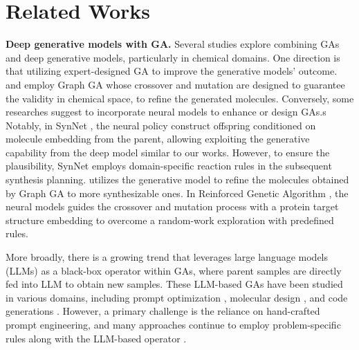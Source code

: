 \section{Related Works}
\label{sec:related}


\textbf{Deep generative models with GA.} Several studies explore combining GAs and deep generative models, particularly in chemical domains. One direction is that utilizing expert-designed GA to improve the generative models' outcome. \citet{ahn2020guiding} and \citet{kim2024genetic} employ Graph GA \citep{jensen2019graph} whose crossover and mutation are designed to guarantee the validity in chemical space, to refine the generated molecules. 
Conversely, some researches suggest to incorporate neural models to enhance or design GAs.s
Notably, in SynNet \citep{gao2022synnet}, the neural policy construct offspring conditioned on molecule embedding from the parent, allowing exploiting the generative capability from the deep model similar to our works. However, to ensure the plausibility, SynNet employs domain-specific reaction rules in the subsequent synthesis planning. 
\citet{gao2024synformer} utilizes the generative model to refine the molecules obtained by Graph GA to more synthesizable ones. In Reinforced Genetic Algorithm \citep[RGA; ][]{fu2022reinforced_ga}, the neural models guides the crossover and mutation process with a protein target structure embedding to overcome a random-work exploration with predefined rules.

More broadly, there is a growing trend that leverages large language models (LLMs) as a black-box operator within GAs, where parent samples are directly fed into LLM to obtain new samples. These LLM-based GAs have been studied in various domains, including prompt optimization \citep{meyerson2024language,liu2024autodan, guo2024evoprompt}, molecular design \citep{wang2024molleo}, and code generations \citep{lehman2023evolution,chen2023evoprompting, ye2024reevo}. However, a primary challenge is the reliance on hand-crafted prompt engineering, and many approaches continue to employ problem-specific rules along with the LLM-based operator \citep{liu2024autodan, wang2024molleo}.




